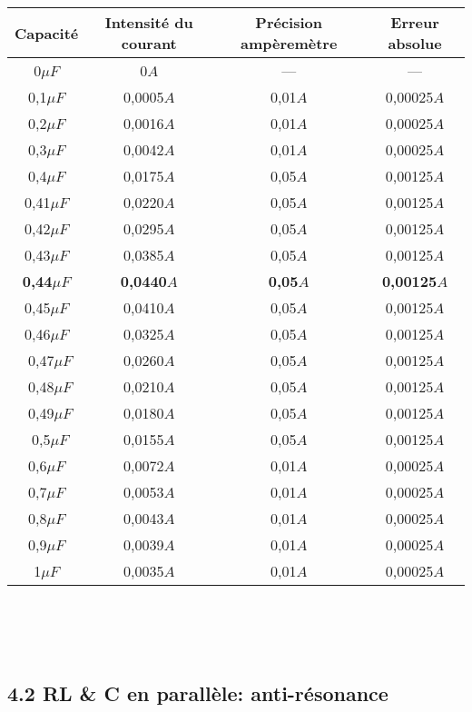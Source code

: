 \documentclass{report}
\begin{document}
\begin{tabular}{|c|c|c|c|}
\hline
\textbf{Capacit\'e} & \textbf{Intensit\'e du courant} & \textbf{Pr\'ecision amp\`erem\`etre} & \textbf{Erreur absolue} \\
\hline
0$\mu F$ & 0$A$ & --- & --- \\
\hline
0,1$\mu F$ & 0,0005$A$ & 0,01$A$ & 0,00025$A$ \\
\hline
0,2$\mu F$ & 0,0016$A$ & 0,01$A$ & 0,00025$A$ \\
\hline
0,3$\mu F$ & 0,0042$A$ & 0,01$A$ & 0,00025$A$ \\
\hline
0,4$\mu F$ & 0,0175$A$ & 0,05$A$ & 0,00125$A$ \\
\hline
0,41$\mu F$ & 0,0220$A$ & 0,05$A$ & 0,00125$A$\\
\hline
0,42$\mu F$ & 0,0295$A$ & 0,05$A$ & 0,00125$A$ \\
\hline
0,43$\mu F$ & 0,0385$A$ & 0,05$A$ & 0,00125$A$ \\
\hline
\textbf{0,44}$\mu F$ & \textbf{0,0440}$A$ & \textbf{0,05}$A$ & \textbf{0,00125}$A$ \\
\hline
0,45$\mu F$ & 0,0410$A$ & 0,05$A$ & 0,00125$A$ \\
\hline
0,46$\mu F$ & 0,0325$A$ & 0,05$A$ & 0,00125$A$ \\
\hline\
0,47$\mu F$ & 0,0260$A$ & 0,05$A$ & 0,00125$A$ \\
\hline\
0,48$\mu F$ & 0,0210$A$ & 0,05$A$ & 0,00125$A$ \\
\hline\
0,49$\mu F$ & 0,0180$A$ & 0,05$A$ & 0,00125$A$ \\
\hline\
0,5$\mu F$ & 0,0155$A$ & 0,05$A$ & 0,00125$A$ \\
\hline
0,6$\mu F$ & 0,0072$A$ & 0,01$A$ & 0,00025$A$ \\
\hline
0,7$\mu F$ & 0,0053$A$ & 0,01$A$ & 0,00025$A$ \\
\hline
0,8$\mu F$ & 0,0043$A$ & 0,01$A$ & 0,00025$A$ \\
\hline
0,9$\mu F$ & 0,0039$A$ & 0,01$A$ & 0,00025$A$ \\
\hline
1$\mu F$ & 0,0035$A$ & 0,01$A$ & 0,00025$A$ \\
\hline
\end{tabular}\\ ~~\\ ~~\\

\pagebreak

\subsection*{4.2 RL \& C en parall\`ele: anti-r\'esonance}
\end{document}
